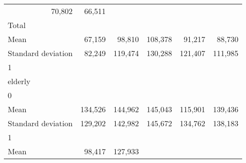 \begin{tabular}{llllll}
  \multicolumn{1}{r}{70,802} &
  \multicolumn{1}{r}{66,511} \\
\multicolumn{1}{l}{\hspace{3em}Total} &
  \multicolumn{1}{|r}{} &
  \multicolumn{1}{r}{} &
  \multicolumn{1}{r}{} &
  \multicolumn{1}{r}{} &
  \multicolumn{1}{r}{} \\
\multicolumn{1}{l}{\hspace{4em}Mean} &
  \multicolumn{1}{|r}{67,159} &
  \multicolumn{1}{r}{98,810} &
  \multicolumn{1}{r}{108,378} &
  \multicolumn{1}{r}{91,217} &
  \multicolumn{1}{r}{88,730} \\
\multicolumn{1}{l}{\hspace{4em}Standard deviation} &
  \multicolumn{1}{|r}{82,249} &
  \multicolumn{1}{r}{119,474} &
  \multicolumn{1}{r}{130,288} &
  \multicolumn{1}{r}{121,407} &
  \multicolumn{1}{r}{111,985} \\
\multicolumn{1}{l}{\hspace{1em}1} &
  \multicolumn{1}{|r}{} &
  \multicolumn{1}{r}{} &
  \multicolumn{1}{r}{} &
  \multicolumn{1}{r}{} &
  \multicolumn{1}{r}{} \\
\multicolumn{1}{l}{\hspace{2em}elderly} &
  \multicolumn{1}{|r}{} &
  \multicolumn{1}{r}{} &
  \multicolumn{1}{r}{} &
  \multicolumn{1}{r}{} &
  \multicolumn{1}{r}{} \\
\multicolumn{1}{l}{\hspace{3em}0} &
  \multicolumn{1}{|r}{} &
  \multicolumn{1}{r}{} &
  \multicolumn{1}{r}{} &
  \multicolumn{1}{r}{} &
  \multicolumn{1}{r}{} \\
\multicolumn{1}{l}{\hspace{4em}Mean} &
  \multicolumn{1}{|r}{134,526} &
  \multicolumn{1}{r}{144,962} &
  \multicolumn{1}{r}{145,043} &
  \multicolumn{1}{r}{115,901} &
  \multicolumn{1}{r}{139,436} \\
\multicolumn{1}{l}{\hspace{4em}Standard deviation} &
  \multicolumn{1}{|r}{129,202} &
  \multicolumn{1}{r}{142,982} &
  \multicolumn{1}{r}{145,672} &
  \multicolumn{1}{r}{134,762} &
  \multicolumn{1}{r}{138,183} \\
\multicolumn{1}{l}{\hspace{3em}1} &
  \multicolumn{1}{|r}{} &
  \multicolumn{1}{r}{} &
  \multicolumn{1}{r}{} &
  \multicolumn{1}{r}{} &
  \multicolumn{1}{r}{} \\
\multicolumn{1}{l}{\hspace{4em}Mean} &
  \multicolumn{1}{|r}{98,417} &
  \multicolumn{1}{r}{127,933} &

\end{tabular}
